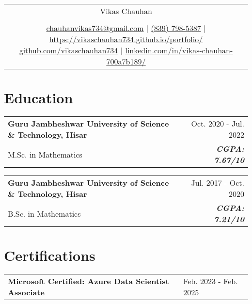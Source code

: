 \documentclass[a4paper,8pt]{article}
\begin{document}
\pagestyle{empty} 


\begin{tabularx}{\linewidth}{@{} C @{}}
\color[HTML]{1C033C} \Huge{Vikas Chauhan} \\[6pt]
\\
\textcolor[HTML]{371e77}{\underline{\raisebox{-0.05\height}{\faEnvelope} chauhanvikas734@gmail.com} $|$}
\textcolor[HTML]{371e77}{\underline{\raisebox{-0.05\height}{\faMobile} (839) 798-5387} $|$}
\textcolor[HTML]{371e77}{\underline{\href{https://vikaschauhan734.github.io/portfolio/}{\raisebox{-0.05\height}{\faGlobeAsia} https://vikaschauhan734.github.io/portfolio/}}}
\textcolor[HTML]{371e77}{\underline{\href{https://github.com/vikaschauhan734}{\raisebox{-0.05\height}{\faGithub} github.com/vikaschauhan734}} $|$}
\textcolor[HTML]{371e77}{\underline{\href{https://linkedin.com/in/vikas-chauhan-700a7b189/}{\raisebox{-0.05\height}{\faLinkedin} linkedin.com/in/vikas-chauhan-700a7b189/}}}
\end{tabularx}

\section{Education}
\begin{tabularx}{\linewidth}{ @{} l X r @{} }
\color[HTML]{1C033C} \textbf{Guru Jambheshwar University of Science \& Technology, Hisar} & & \color[HTML]{371e77} Oct. 2020 - Jul. 2022 \\
M.Sc. in Mathematics & & \color[HTML]{4B28A4} \textit{\textbf{CGPA: 7.67/10}}
\end{tabularx}

\begin{tabularx}{\linewidth}{ @{} l X r @{} }
\color[HTML]{1C033C} \textbf{Guru Jambheshwar University of Science \& Technology, Hisar} & & \color[HTML]{371e77} Jul. 2017 - Oct. 2020 \\
B.Sc. in Mathematics & & \color[HTML]{4B28A4} \textit{\textbf{CGPA: 7.21/10}}
\end{tabularx}

\section{Certifications}
\begin{tabularx}{\linewidth}{ @{} l X @{} }
\color[HTML]{1C033C} \textbf{Microsoft Certified: Azure Data Scientist Associate} & \hfill \color[HTML]{371e77} Feb. 2023 - Feb. 2025 \\[4pt]
\end{tabularx}
\end{document}
